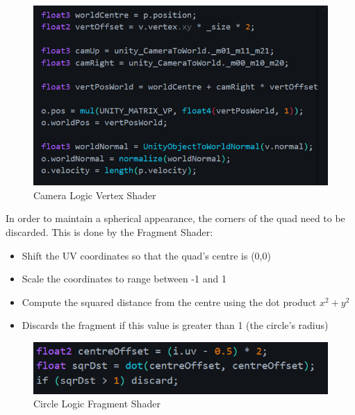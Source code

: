\documentclass[12pt]{article}
\begin{document}
    \begin{figure}[H]
        \begin{center}
            \includegraphics[]{cameraLogic.png}
            \caption{Camera Logic Vertex Shader \cite{lague2}}
        \end{center}
    \end{figure}

    In order to maintain a spherical appearance, the corners of the quad need to be discarded. This is done by the Fragment Shader:
    
    \begin{itemize}
        \item Shift the UV coordinates so that the quad's centre is (0,0)
        \item Scale the coordinates to range between -1 and 1
        \item Compute the squared distance from the centre using the dot product $x^2 + y^2$
        \item Discards the fragment if this value is greater than 1 (the circle's radius)
    \end{itemize}

    \begin{figure}[H]
        \begin{center}
            \includegraphics[]{circleLogic.png}
            \caption{Circle Logic Fragment Shader \cite{lague2}}
        \end{center}
    \end{figure}
\end{document}
